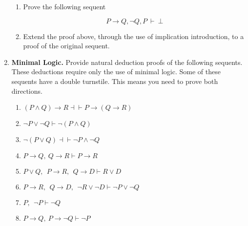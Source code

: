 \documentclass[11pt]{report}
\begin{document}
\begin{enumerate}
\begin{enumerate}
		\item Prove the following sequent 
		
		$$ P \to Q, \lnot Q, P \ \vdash \ \bot$$

		\item Extend the proof above, through the use of implication introduction, to a proof of the original sequent.

	\end{enumerate}
	
	\item \textbf{Minimal Logic.} Provide natural deduction proofs of the following sequents. These deductions require only the use of minimal logic. Some of these sequents have a double turnstile. This means you need to prove both directions. 
	 
	\begin{enumerate}
		\item $( P\land  Q) \rightarrow  R \dashv\vdash  P\rightarrow ( Q \rightarrow  R) $
		\item $\lnot P\lor \lnot Q \vdash \lnot( P\land  Q)$
		\item $\lnot( P\lor  Q) \dashv\vdash \lnot  P\land \lnot  Q$
		\item $ P\rightarrow  Q, \  Q \rightarrow  R \vdash  P\rightarrow  R $
		\item $ P\lor  Q,\ \  P\to  R,\ \  Q \to  D \vdash   R \lor  D$
		\item $ P\to  R,\ \  Q \to  D,\ \ \neg R \lor \neg  D \vdash  \neg P\lor \neg  Q$
		\item $ P,\ \ \neg  P\vdash  \neg  Q$
	   \item $ P\rightarrow Q, \  P\rightarrow \lnot Q \vdash \lnot  P$
	\end{enumerate}		

\end{enumerate}
	
\end{document}
